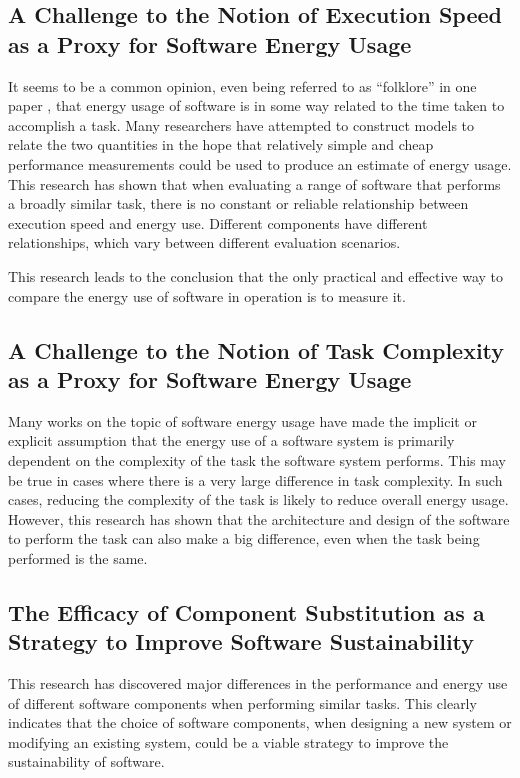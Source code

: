 \subsection{A Challenge to the Notion of Execution Speed as a Proxy for Software Energy Usage}
\label{contrib:speed as proxy}

It seems to be a common opinion, even being referred to as \enquote{folklore} in one paper \citep{Yuki2013}, that energy usage of software is in some way related to the time taken to accomplish a task. Many researchers have attempted to construct models to relate the two quantities in the hope that relatively simple and cheap performance measurements could be used to produce an estimate of energy usage. This research has shown that when evaluating a range of software that performs a broadly similar task, there is no constant or reliable relationship between execution speed and energy use. Different components have different relationships, which vary between different evaluation scenarios.

This research leads to the conclusion that the only practical and effective way to compare the energy use of software in operation is to measure it.

\subsection{A Challenge to the Notion of Task Complexity as a Proxy for Software Energy Usage}
\label{contrib:complexity as proxy}

Many works on the topic of software energy usage have made the implicit or explicit assumption that the energy use of a software system is primarily dependent on the complexity of the task the software system performs. This may be true in cases where there is a very large difference in task complexity. In such cases, reducing the complexity of the task is likely to reduce overall energy usage. However, this research has shown that the architecture and design of the software to perform the task can also make a big difference, even when the task being performed is the same.

\subsection{The Efficacy of Component Substitution as a Strategy to Improve Software Sustainability}
\label{contrib:efficacy}

This research has discovered major differences in the performance and energy use of different software components when performing similar tasks. This clearly indicates that the choice of software components, when designing a new system or modifying an existing system, could be a viable strategy to improve the sustainability of software.

